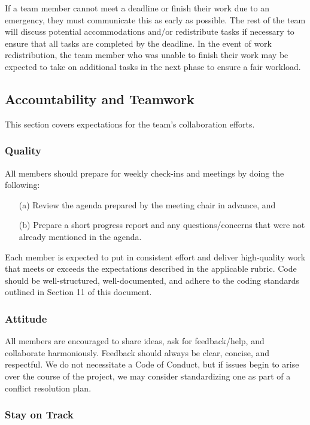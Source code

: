 \documentclass{article}
\begin{document}
If a team member cannot meet a deadline or finish their work due to an
emergency, they must communicate this as early as possible. The rest of the team
will discuss potential accommodations and/or redistribute tasks if necessary to
ensure that all tasks are completed by the deadline. In the event of work
redistribution, the team member who was unable to finish their work may be
expected to take on additional tasks in the next phase to ensure a fair workload.

\subsection*{Accountability and Teamwork}

This section covers expectations for the team's collaboration efforts.

\subsubsection*{Quality} 

All members should prepare for weekly check-ins and meetings by doing the
following:

\begin{itemize}
  \item[(a)] Review the agenda prepared by the meeting chair in advance, and
  \item[(b)] Prepare a short progress report and any questions/concerns that
  were not already mentioned in the agenda.
\end{itemize}

\noindent Each member is expected to put in consistent effort and deliver
high-quality work that meets or exceeds the expectations described in the
applicable rubric. Code should be well-structured, well-documented, and adhere
to the coding standards outlined in Section 11 of this document.

\subsubsection*{Attitude}

All members are encouraged to share ideas, ask for feedback/help, and
collaborate harmoniously. Feedback should always be clear, concise, and
respectful. We do not necessitate a Code of Conduct, but if issues begin to
arise over the course of the project, we may consider standardizing one as part
of a conflict resolution plan.

\subsubsection*{Stay on Track}
\end{document}
